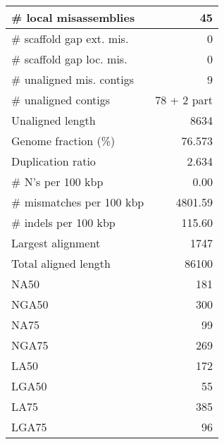 \documentclass[12pt,a4paper]{article}
\begin{document}
\begin{table}[ht]
\begin{center}
\begin{tabular}{|l*{1}{|r}|}
\# local misassemblies & 45 \\ \hline
\# scaffold gap ext. mis. & 0 \\ \hline
\# scaffold gap loc. mis. & 0 \\ \hline
\# unaligned mis. contigs & 9 \\ \hline
\# unaligned contigs & 78 + 2 part \\ \hline
Unaligned length & 8634 \\ \hline
Genome fraction (\%) & 76.573 \\ \hline
Duplication ratio & 2.634 \\ \hline
\# N's per 100 kbp & 0.00 \\ \hline
\# mismatches per 100 kbp & 4801.59 \\ \hline
\# indels per 100 kbp & 115.60 \\ \hline
Largest alignment & 1747 \\ \hline
Total aligned length & 86100 \\ \hline
NA50 & 181 \\ \hline
NGA50 & 300 \\ \hline
NA75 & 99 \\ \hline
NGA75 & 269 \\ \hline
LA50 & 172 \\ \hline
LGA50 & 55 \\ \hline
LA75 & 385 \\ \hline
LGA75 & 96 \\ \hline
\end{tabular}
\end{center}
\end{table}
\end{document}
